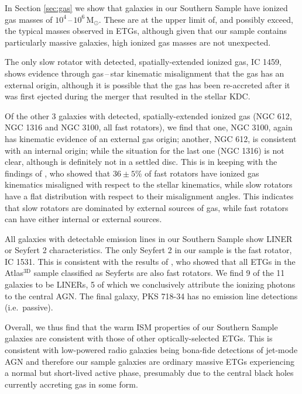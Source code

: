 \documentclass[a4paper,fleqn,usenatbib]{mnras}
\begin{document}
	In Section \ref{sec:gas} we show that galaxies in our Southern Sample have ionized gas masses of $10^4$\,--\,$10^6\,\mathrm{M_\odot}$. These are at the upper limit of, and possibly exceed, the typical masses observed in ETGs, although given that our sample contains particularly massive galaxies, high ionized gas masses are not unexpected. 

	The only slow rotator with detected, spatially-extended ionized gas, IC 1459, shows evidence through gas\,--\,star kinematic misalignment that the gas has an external origin, although it is possible that the gas has been re-accreted after it was first ejected during the merger that resulted in the stellar KDC. 

	Of the other 3 galaxies with detected, spatially-extended ionized gas (NGC 612, NGC 1316 and NGC 3100, all fast rotators), we find that one, NGC 3100, again has kinematic evidence of an external gas origin; another, NGC 612, is consistent with an internal origin; while the situation for the last one (NGC 1316) is not clear, although is definitely not in a settled disc. This is in keeping with the findings of \citet{Davis2011a}, who showed that $36\pm5$\% of fast rotators have ionized gas kinematics misaligned with respect to the stellar kinematics, while slow rotators have a flat distribution with respect to their misalignment angles. This indicates that slow rotators are dominated by external sources of gas, while fast rotators can have either internal or external sources. 

	All galaxies with detectable emission lines in our Southern Sample show LINER or Seyfert 2 characteristics. The only Seyfert 2 in our sample is the fast rotator, IC 1531. This is consistent with the results of \citet{Nyland2016}, who showed that all ETGs in the Atlas$^\text{3D}$ sample classified as Seyferts are also fast rotators. We find 9 of the 11 galaxies to be LINERs, 5 of which we conclusively attribute the ionizing photons to the central AGN. The final galaxy, PKS 718-34 has no emission line detections (i.e.\ passive). 

	Overall, we thus find that the warm ISM properties of our Southern Sample galaxies are consistent with those of other optically-selected ETGs. This is consistent with low-powered radio galaxies being bona-fide detections of jet-mode AGN and therefore our sample galaxies are ordinary massive ETGs experiencing a normal but short-lived active phase, presumably due to the central black holes currently accreting gas in some form. 
\end{document}
